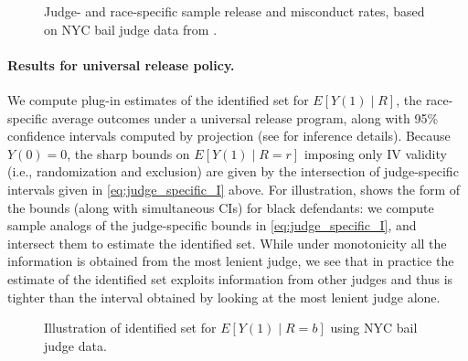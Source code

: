 \documentclass[12pt]{article}%
\theoremstyle{definition}
\newcommand\1{\operatorname{I}\indicatorfence}
\begin{document}
\begin{figure}[tp]
\centering
\caption{Judge- and race-specific sample release and misconduct rates, based on
  NYC bail judge data from \textcite{adh22}.}\label{fig:nyc_raw}
\end{figure}

\paragraph{Results for universal release policy.} We compute plug-in estimates of the
identified set for $E[Y(1) \mid R]$, the race-specific average outcomes under a
universal release program, along with 95\% confidence intervals computed by
projection (see  for inference details). Because $Y(0) = 0$,
the sharp bounds on $E[Y(1) \mid R=r]$ imposing only IV validity (i.e.,
randomization and exclusion) are given by the intersection of judge-specific
intervals given in \cref{eq:judge_specific_I} above. For illustration,
 shows the form of the bounds (along with simultaneous CIs) for
black defendants: we compute sample analogs of the judge-specific bounds in
\cref{eq:judge_specific_I}, and intersect them to estimate the identified set.
While under monotonicity all the information is obtained from the most lenient
judge, we see that in practice the estimate of the identified set exploits
information from other judges and thus is tighter than the interval obtained by
looking at the most lenient judge alone.

\begin{figure}[tp]
    \centering
    
    \caption{Illustration of identified set for $E[Y(1) \mid R=b]$ using NYC
      bail judge data.}\label{fig:id-set-illustration}
\end{figure}
\end{document}
